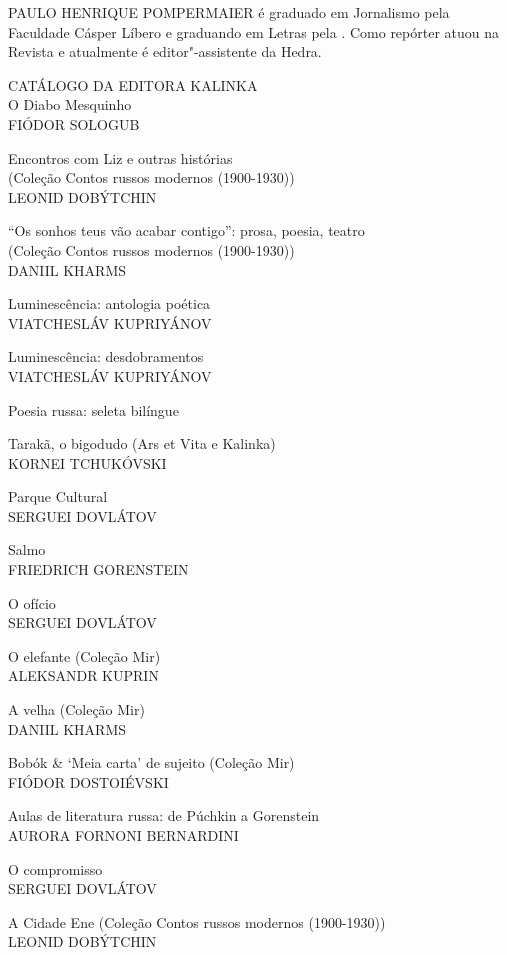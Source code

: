 \medskip

\noindent{}PAULO HENRIQUE POMPERMAIER é graduado em Jornalismo pela Faculdade Cásper Líbero e graduando em Letras pela . Como repórter atuou na Revista {} e atualmente é editor"-assistente da Hedra.

\afterpage{\blankpage}

\newpage
\pagestyle{empty}
\MyriadPro

\footnotesize{
\noindent{}CATÁLOGO DA EDITORA KALINKA\\[5pt]

\noindent{}O Diabo Mesquinho\\
FIÓDOR SOLOGUB
\medskip

\noindent{}Encontros com Liz e outras histórias\\(Coleção Contos russos modernos (1900-1930))\\
LEONID DOBÝTCHIN
\medskip

\noindent{}“Os sonhos teus vão acabar contigo”: prosa, poesia, teatro\\(Coleção Contos russos modernos (1900-1930))\\
DANIIL KHARMS
\medskip

\noindent{}Luminescência: antologia poética\\
VIATCHESLÁV KUPRIYÁNOV
\medskip

\noindent{}Luminescência: desdobramentos\\
VIATCHESLÁV KUPRIYÁNOV
\medskip

\noindent{}Poesia russa: seleta bilíngue
\medskip

\noindent{}Tarakã, o bigodudo (Ars et Vita e Kalinka)\\
KORNEI TCHUKÓVSKI
\medskip

\noindent{}Parque Cultural\\
SERGUEI DOVLÁTOV
\medskip

\noindent{}Salmo\\
FRIEDRICH GORENSTEIN
\medskip

\noindent{}O ofício\\
SERGUEI DOVLÁTOV
\medskip

\noindent{}O elefante (Coleção Mir)\\
ALEKSANDR KUPRIN
\medskip

\noindent{}A velha (Coleção Mir)\\
DANIIL KHARMS 
\medskip

\noindent{}Bobók \& ‘Meia carta’ de sujeito (Coleção Mir)\\
FIÓDOR DOSTOIÉVSKI
\medskip

\noindent{}Aulas de literatura russa: de Púchkin a Gorenstein \\
AURORA FORNONI BERNARDINI
\medskip

\noindent{}O compromisso\\
SERGUEI DOVLÁTOV
\medskip

\noindent{}A Cidade Ene (Coleção Contos russos modernos (1900-1930))\\
LEONID DOBÝTCHIN
}

